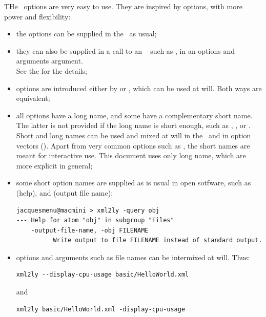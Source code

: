 THe \oahRepr\ options are very easy to use. They are inspired by  options, with more power and flexibility:
\begin{itemize}
\item the options can be supplied in the \CLI\ as usual;

  \item they can also be supplied in a call to an \API\  such as , in an options and arguments argument. \\
    		See the  for the details;


\item options are introduced either by \code{-} or \code{--}, which can be used at will. Both ways are equivalent;

\item all options have a long name, and some have a complementary short name.
 The latter is not provided if the long name is short enough, such as , ,  or .\\
    Short and long names can be used and mixed at will in the \CLI\ and in option vectors (\API).
    Apart from very common options such as , the short names are meant for interactive use. This document uses only long name, which are more explicit in general;

\item some short option names are supplied as is usual in open sotfware, such as  (help), and  (output file name):
\begin{lstlisting}[language=Terminal]
jacquesmenu@macmini > xml2ly -query obj
--- Help for atom "obj" in subgroup "Files"
    -output-file-name, -obj FILENAME
          Write output to file FILENAME instead of standard output.
\end{lstlisting}

\item options and arguments such as file names can be intermixed at will. Thus:
\begin{lstlisting}[language=Terminal]
xml2ly --display-cpu-usage basic/HelloWorld.xml
\end{lstlisting}
and
\begin{lstlisting}[language=Terminal]
xml2ly basic/HelloWorld.xml -display-cpu-usage
\end{lstlisting}


\end{itemize}
